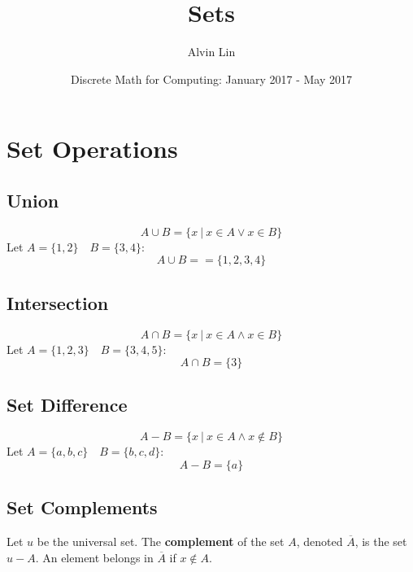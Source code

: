 \documentclass[letterpaper, 12pt]{math}
\title{Sets}
\author{Alvin Lin}
\date{Discrete Math for Computing: January 2017 - May 2017}
\begin{document}
\maketitle

\section*{Set Operations}

\subsection*{Union}
\[ A \cup B = \{x\ |\ x \in A \vee x \in B\} \]
Let \( A = \{1,2\} \quad B = \{3,4\} \):
\[ A \cup B = =\{1,2,3,4\} \]

\subsection*{Intersection}
\[ A \cap B = \{x\ |\ x \in A \wedge x \in B\} \]
Let \( A = \{1,2,3\} \quad B = \{3,4,5\} \):
\[ A \cap B = \{3\} \]

\subsection*{Set Difference}
\[ A-B = \{x\ |\ x \in A \wedge x \notin B\} \]
Let \( A = \{a,b,c\} \quad B = \{b,c,d\} \):
\[ A-B = \{a\} \]

\subsection*{Set Complements}
Let \( u \) be the universal set. The \textbf{complement} of the set \( A \),
denoted \( \overline{A} \), is the set \( u-A \). An element belongs in \( \overline{A} \)
if \( x \notin A \).
\end{document}
